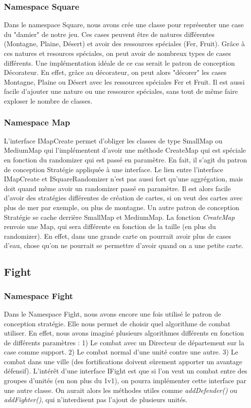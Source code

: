 			\subsubsection{Namespace Square}
				Dans le namespace Square, nous avons crée une classe pour représenter une case du "damier" de notre jeu.
			Ces cases peuvent être de natures différentes (Montagne, Plaine, Désert) et avoir des ressources spéciales (Fer, Fruit).
			Grâce à ces natures et resources spéciales, on peut avoir de nombreux types de cases différents.
			Une implémentation idéale de ce cas serait le patron de conception Décorateur.
			En effet, grâce au décorateur, on peut alors "décorer" les cases Montagne, Plaine ou Désert avec les ressources spéciales Fer et Fruit.
			Il est aussi facile d'ajouter une nature ou une ressource spéciales, sans tout de même faire exploser le nombre de classes.
			
			\subsubsection{Namespace Map}
				L'interface IMapCreate permet d'obliger les classes de type SmallMap ou MediumMap qui l'implémentent d'avoir une méthode CreateMap qui est spéciale en fonction du randomizer qui est passé en paramètre.
			En fait, il s'agit du patron de conception Stratégie appliquée à une interface.
			Le lien entre l'interface IMapCreate et ISquareRandomizer n'est pas aussi fort qu'une aggrégation, mais doit quand même avoir un randomizer passé en paramètre.
			Il est alors facile d'avoir des stratégies différentes de création de cartes, si on veut des cartes avec plus de mer par exemple, ou plus de montagne.
				Un autre patron de conception Stratégie se cache derrière SmallMap et MediumMap. La fonction \textit{CreateMap} renvoie une Map, qui sera différente en fonction de la taille (en plus du randomizer).
			En effet, dans une grande carte on pourrait avoir plus de cases d'eau, chose qu'on ne pourrait se permettre d'avoir quand on a une petite carte.	
	
	\subsection{Fight}
		\subsubsection{Namespace Fight}
			Dans le Namespace Fight, nous avons encore une fois utilisé le patron de conception stratégie.
			Elle nous permet de choisir quel algorithme de combat utiliser.
			En effet, nous avons imaginé plusieurs algorithmes différents en fonction de différents paramètres :
				1) Le combat avec un Directeur de département sur la case comme support.
				2) Le combat normal d'une unité contre une autre.
				3) Le combat dans une ville (des fortifications doivent sûrement apporter un avantage défensif).
			L'intérêt d'une interface IFight est que si l'on veut un combat entre des groupes d'unités (en non plus du 1v1), on pourra implémenter cette interface par une autre classe.
			On aurait alors les méthodes utiles comme \textit{addDefender()} ou \textit{addFighter()}, qui n'interdisent pas l'ajout de plusieurs unités.
	
